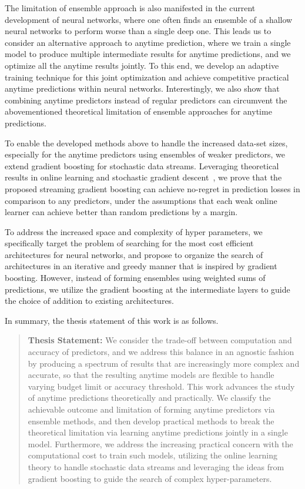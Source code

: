 The limitation of ensemble approach is also manifested in the current development of neural networks, where one often finds an ensemble of a shallow neural networks to perform worse than a single deep one.
This leads us to consider an alternative approach to anytime prediction, where we train a single model to produce multiple intermediate results for anytime predictions, and we optimize all the anytime results jointly. To this end, we develop an adaptive training technique for this joint optimization and achieve competitive practical anytime predictions within neural networks. Interestingly, we also show that combining anytime predictors instead of regular predictors can circumvent the abovementioned theoretical limitation of ensemble approaches for anytime predictions.  

To enable the developed methods above to handle the increased data-set sizes, especially for the anytime predictors using ensembles of weaker predictors, we extend gradient boosting for stochastic data streams. Leveraging theoretical results in online learning and stochastic gradient descent~\citep{}, we prove that the proposed streaming gradient boosting can achieve no-regret in prediction losses in comparison to any predictors, under the assumptions that each weak online learner can achieve better than random predictions by a margin. 


To address the increased space and complexity of hyper parameters, we specifically target the problem of searching for the most cost efficient architectures for neural networks, and propose to organize the search of architectures in an iterative and greedy manner that is inspired by gradient boosting. However, instead of forming ensembles using weighted sums of predictions, we utilize the gradient boosting at the intermediate layers to guide the choice of addition to existing architectures.

In summary, the thesis statement of this work is as follows. 
\begin{quotation}
\textbf{Thesis Statement:} We consider the trade-off between computation and accuracy of predictors, and we address this balance in an agnostic fashion by producing a spectrum of results that are increasingly more complex and accurate, so that the resulting anytime models are flexible to handle varying budget limit or accuracy threshold. 
This work advances the study of anytime predictions theoretically and practically. 
We classify the achievable outcome and limitation of forming anytime predictors via ensemble methods, and then develop practical methods to break the theoretical limitation via learning anytime predictions jointly in a single model. Furthermore, we address the increasing practical concern with the computational cost to train such models, utilizing the online learning theory to handle stochastic data streams and leveraging the ideas from gradient boosting to guide the search of complex hyper-parameters.
\end{quotation}



